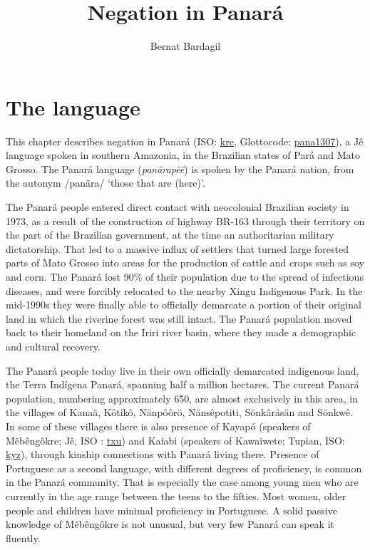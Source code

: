\documentclass[output=paper,colorlinks,citecolor=brown,draft]{langscibook}
\author{Bernat Bardagil\orcid{0000-0002-1190-7164}\affiliation{Ghent University}}%
\title{Negation in Panará}
\begin{document}
\maketitle

\section{The language}\label{pan:sec:PNR}

This chapter describes negation in Panará (ISO: \href{https://iso639-3.sil.org/code/kre}{kre}, Glottocode: \href{https://glottolog.org/resource/languoid/id/pana1307}{pana1307}), a Jê language spoken in southern Amazonia, in the Brazilian states of Pará and Mato Grosso. The Panará language (\textit{panärapëë}) is spoken by the Panará nation, from the autonym /panãra/ `those that are (here)'. 

The Panará people entered direct contact with neocolonial Brazilian society in 1973, as a result of the construction of highway BR-163 through their territory on the part of the Brazilian government, at the time an authoritarian military dictatorship. That led to a massive influx of settlers that turned large forested parts of Mato Grosso into areas for the production of cattle and crops such as soy and corn. The Panará lost 90\% of their population due to the spread of infectious diseases, and were forcibly relocated to the nearby Xingu Indigenous Park. In the mid-1990s they were finally able to officially demarcate a portion of their original land in which the riverine forest was still intact. The Panará population moved back to their homeland on the Iriri river basin, where they made a demographic and cultural recovery.

The Panará people today live in their own officially demarcated indigenous land, the Terra Indígena Panará, spanning half a million hectares. The current Panará population, numbering approximately 650, are almost exclusively in this area, in the villages of Kanaä, Kôtikô, Nänpôôrö, Nänsêpotiti, Sönkâräsän and Sönkwê.
In some of these villages there is also presence of Kayapó (speakers of Mẽbêngôkre; Jê, ISO : \href{https://iso639-3.sil.org/code/txu}{txu}) and Kaiabi (speakers of Kawaiwete; Tupian, ISO: \href{https://iso639-3.sil.org/code/kyz}{kyz}), through kinship connections with Panará living there. Presence of Portuguese as a second language, with different degrees of proficiency, is common in the Panará community. That is especially the case among young men who are currently in the age range between the teens to the fifties. Most women, older people and children have minimal proficiency in Portuguese. A solid passive knowledge of Mẽbêngôkre is not unusual, but very few Panará can speak it fluently.
\end{document}

